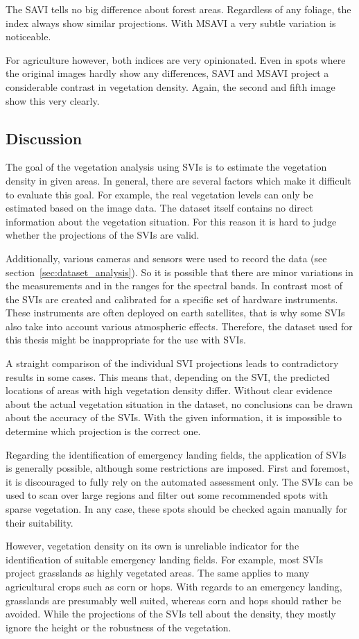 The SAVI tells no big difference about forest areas. Regardless of any foliage, the index always show similar projections. With MSAVI a very subtle variation is noticeable.

For agriculture however, both indices are very opinionated. Even in spots where the original images hardly show any differences, SAVI and MSAVI project a considerable contrast in vegetation density. Again, the second and fifth image show this very clearly.

\subsection{Discussion}
The goal of the vegetation analysis using SVIs is to estimate the vegetation density in given areas. In general, there are several factors which make it difficult to evaluate this goal. For example, the real vegetation levels can only be estimated based on the image data. The dataset itself contains no direct information about the vegetation situation. For this reason it is hard to judge whether the projections of the SVIs are valid.

Additionally, various cameras and sensors were used to record the data (see section~\ref{sec:dataset_analysis}). So it is possible that there are minor variations in the measurements and in the ranges for the spectral bands. In contrast most of the SVIs are created and calibrated for a specific set of hardware instruments. These instruments are often deployed on earth satellites, that is why some SVIs also take into account various atmospheric effects. Therefore, the dataset used for this thesis might be inappropriate for the use with SVIs.

A straight comparison of the individual SVI projections leads to contradictory results in some cases. This means that, depending on the SVI, the predicted locations of areas with high vegetation density differ. Without clear evidence about the actual vegetation situation in the dataset, no conclusions can be drawn about the accuracy of the SVIs. With the given information, it is impossible to determine which projection is the correct one.

Regarding the identification of emergency landing fields, the application of SVIs is generally possible, although some restrictions are imposed. First and foremost, it is discouraged to fully rely on the automated assessment only. The SVIs can be used to scan over large regions and filter out some recommended spots with sparse vegetation. In any case, these spots should be checked again manually for their suitability.

However, vegetation density on its own is unreliable indicator for the identification of suitable emergency landing fields. For example, most SVIs project grasslands as highly vegetated areas. The same applies to many agricultural crops such as corn or hops. With regards to an emergency landing, grasslands are presumably well suited, whereas corn and hops should rather be avoided. While the projections of the SVIs tell about the density, they mostly ignore the height or the robustness of the vegetation.

\clearpage
